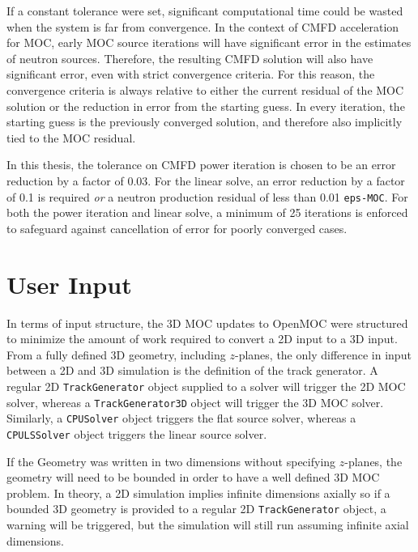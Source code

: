 If a constant tolerance were set, significant computational time could be wasted when the system is far from convergence. In the context of \ac{CMFD} acceleration for \ac{MOC}, early \ac{MOC} source iterations will have significant error in the estimates of neutron sources. Therefore, the resulting \ac{CMFD} solution will also have significant error, even with strict convergence criteria. For this reason, the convergence criteria is always relative to either the current residual of the \ac{MOC} solution or the reduction in error from the starting guess. In every iteration, the starting guess is the previously converged solution, and therefore also implicitly tied to the \ac{MOC} residual.

In this thesis, the tolerance on \ac{CMFD} power iteration is chosen to be an error reduction by a factor of 0.03. For the linear solve, an error reduction by a factor of 0.1 is required \textit{or} a neutron production residual of less than 0.01 \texttt{eps-MOC}. For both the power iteration and linear solve, a minimum of 25 iterations is enforced to safeguard against cancellation of error for poorly converged cases.


\section{User Input}
\label{sec:user-input}

In terms of input structure, the 3D MOC updates to OpenMOC were structured to minimize the amount of work required to convert a 2D input to a 3D input. From a fully defined 3D geometry, including $z$-planes, the only difference in input between a 2D and 3D simulation is the definition of the track generator. A regular 2D \texttt{TrackGenerator} object supplied to a solver will trigger the 2D \ac{MOC} solver, whereas a \texttt{TrackGenerator3D} object will trigger the 3D \ac{MOC} solver. Similarly, a \texttt{CPUSolver} object triggers the flat source solver, whereas a \texttt{CPULSSolver} object triggers the linear source solver.

If the Geometry was written in two dimensions without specifying $z$-planes, the geometry will need to be bounded in order to have a well defined 3D \ac{MOC} problem. In theory, a 2D simulation implies infinite dimensions axially so if a bounded 3D geometry is provided to a regular 2D \texttt{TrackGenerator} object, a warning will be triggered, but the simulation will still run assuming infinite axial dimensions.

